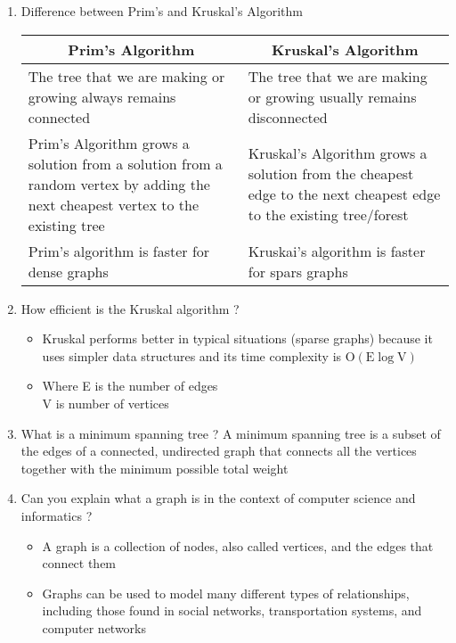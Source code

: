 \begin{enumerate}[label=\arabic*. ]
	\item Difference between Prim's and Kruskal's Algorithm
	\answer ~ \vspace{-2em}
		\begin{center}
			\begin{tabular}{|p{.4\columnwidth}|p{}|} \hline
				\multicolumn{1}{|c|}{Prim's Algorithm} &
				\multicolumn{1}{|c|}{Kruskal's Algorithm} \\ \hline
				The tree that we are making or growing always remains connected &
				The tree that we are making or growing usually remains disconnected \\ \hline
				Prim's Algorithm grows a solution from a solution from a random vertex
				by adding the next cheapest vertex to the existing tree &
				Kruskal's Algorithm grows a solution from the cheapest edge to the next cheapest
				edge to the existing tree/forest \\ \hline
				Prim's algorithm is faster for dense graphs &
				Kruskai's algorithm is faster for spars graphs \\ \hline
			\end{tabular}
		\end{center}

	\item How efficient is the Kruskal algorithm ?
	\answer
		\begin{itemize}[label=$\ast$]
			\item Kruskal performs better in typical situations (sparse graphs) because it uses
				simpler data structures and its time complexity is
				$\text{O}(\text{E}\log\text{V})$
			\item Where E is the number of edges \\ V is number of vertices
		\end{itemize}
	
	\item What is a minimum spanning tree ?
	\answer A minimum spanning tree is a subset of the edges of a connected, undirected graph that connects
		all the vertices together with the minimum possible total weight
	
	\item Can you explain what a graph is in the context of computer science and informatics ?
	\answer
		\begin{itemize}[label=$\ast$]
			\item A graph is a collection of nodes, also called vertices, and the edges that connect
				them
			\item Graphs can be used to model many different types of relationships, including those
				found in social networks, transportation systems, and computer networks
		\end{itemize}
	

\end{enumerate}

